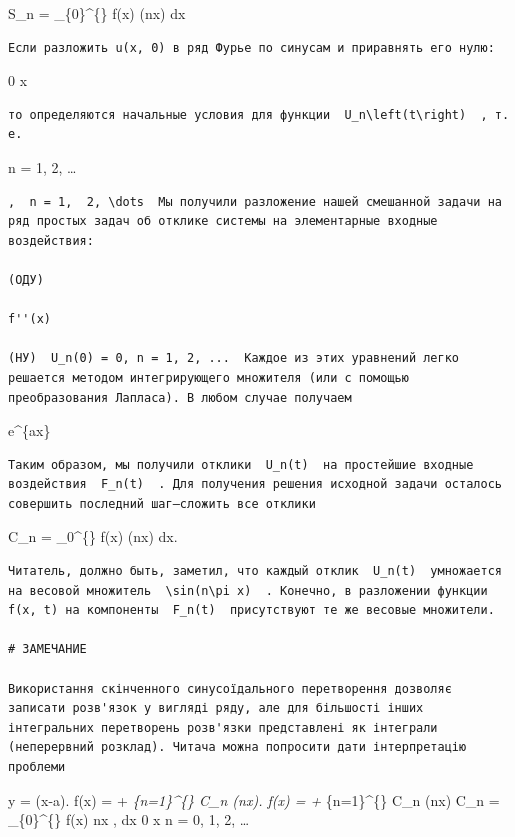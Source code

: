 \documentclass[
  ukrainian,
]{article}
\begin{document}
S\_n =  \int\_\{0\}\^{}\{\pi\} f(x) \sin(nx) dx

\begin{verbatim}
Если разложить u(x, 0) в ряд Фурье по синусам и приравнять его нулю:
\end{verbatim}

0 \le x \le \pi

\begin{verbatim}
то определяются начальные условия для функции  U_n\left(t\right)  , т. е.
\end{verbatim}

n = 1, 2, \ldots{}

\begin{verbatim}
,  n = 1,  2, \dots  Мы получили разложение нашей смешанной задачи на ряд простых задач об отклике системы на элементарные входные воздействия:

(OДУ)

f''(x)

(HУ)  U_n(0) = 0, n = 1, 2, ...  Каждое из этих уравнений легко решается методом интегрирующего множителя (или с помощью преобразования Лапласа). В любом случае получаем
\end{verbatim}

 e\^{}\{ax\}

\begin{verbatim}
Таким образом, мы получили отклики  U_n(t)  на простейшие входные воздействия  F_n(t)  . Для получения решения исходной задачи осталось совершить последний шаг—сложить все отклики
\end{verbatim}

C\_n =  \int\_0\^{}\{\pi\} f(x) \cos(nx) dx.

\begin{verbatim}
Читатель, должно быть, заметил, что каждый отклик  U_n(t)  умножается на весовой множитель  \sin(n\pi x)  . Конечно, в разложении функции f(x, t) на компоненты  F_n(t)  присутствуют те же весовые множители.

# ЗАМЕЧАНИЕ

Використання скінченного синусоїдального перетворення дозволяє записати розв'язок у вигляді ряду, але для більшості інших інтегральних перетворень розв'язки представлені як інтеграли (неперервний розклад). Читача можна попросити дати інтерпретацію проблеми
\end{verbatim}

y = (x-a). f(x) =  +
\sum\emph{\{n=1\}\^{}\{\infty\} C\_n \cos(nx). f(x) =  +
\sum}\{n=1\}\^{}\{\infty\} C\_n \cos(nx) \qquad C\_n = 
\int\_\{0\}\^{}\{\pi\} f(x) \cos nx , dx 0 \le x \le \pi \qquad n = 0,
1, 2, \dots
\end{document}
